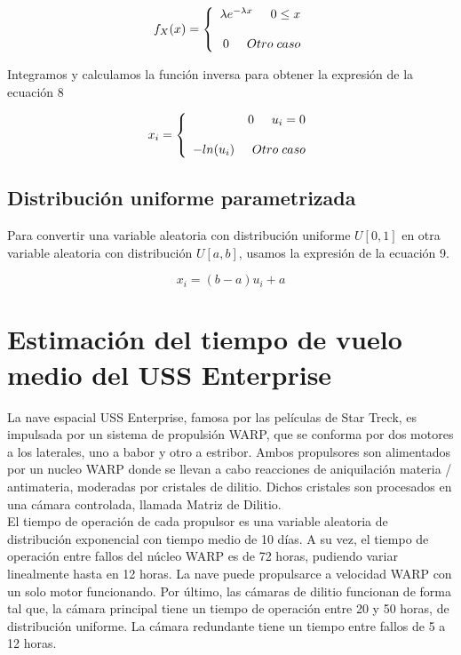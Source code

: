 \documentclass[10pt,journal,compsoc]{IEEEtran}
\begin{document}
\begin{equation}
  f_{X}(x) = \left\{
  \begin{array}{rl}
	\lambda e^{-\lambda x} \hspace{0.5cm} 0 \le x\\\\
	0 \hspace{0.5 cm} Otro \hspace{0.1cm} caso
  \end{array} \right.
\end{equation}

Integramos y calculamos la funci\'on inversa para obtener la expresi\'on de la ecuaci\'on 8

\begin{equation}
 x_i = \left\{
  \begin{array}{rl}
	0 \hspace{0.5 cm} u_i = 0\\\\
	-ln(u_i) \hspace{0.5cm} Otro \hspace{0.1cm} caso
  \end{array} \right.
\end{equation}

\subsection{Distribuci\'on uniforme parametrizada}
Para convertir una variable aleatoria con distribuci\'on uniforme $U[0,1]$ en otra variable aleatoria con distribuci\'on
$U[a, b]$, usamos la expresi\'on de la ecuaci\'on 9.

\begin{equation}
 x_i = (b-a)u_i + a
\end{equation}




\section{Estimaci\'on del tiempo de vuelo medio del USS Enterprise}
La nave espacial USS Enterprise, famosa por las pel\'iculas de Star Treck, es impulsada por un sistema de propulsi\'on WARP, 
que se conforma por dos motores a los laterales, uno a babor y otro a estribor. Ambos propulsores son alimentados por un nucleo WARP
donde se llevan a cabo reacciones de aniquilaci\'on materia / antimateria, moderadas por cristales de dilitio. Dichos cristales 
son procesados en una c\'amara controlada, llamada Matriz de Dilitio.\\
El tiempo de operaci\'on de cada propulsor es una variable aleatoria de distribuci\'on exponencial con tiempo medio de 10 d\'ias. 
A su vez, el tiempo de operaci\'on entre fallos del n\'ucleo WARP es de 72 horas, pudiendo variar linealmente hasta en 12 horas. 
La nave puede propulsarce a velocidad WARP con un solo motor funcionando. Por \'ultimo, las c\'amaras de dilitio funcionan de forma tal que, la c\'amara principal tiene un tiempo de operaci\'on entre 
20 y 50 horas, de distribuci\'on uniforme. La c\'amara redundante tiene un tiempo entre fallos de 5 a 12 horas.\\
\end{document}
